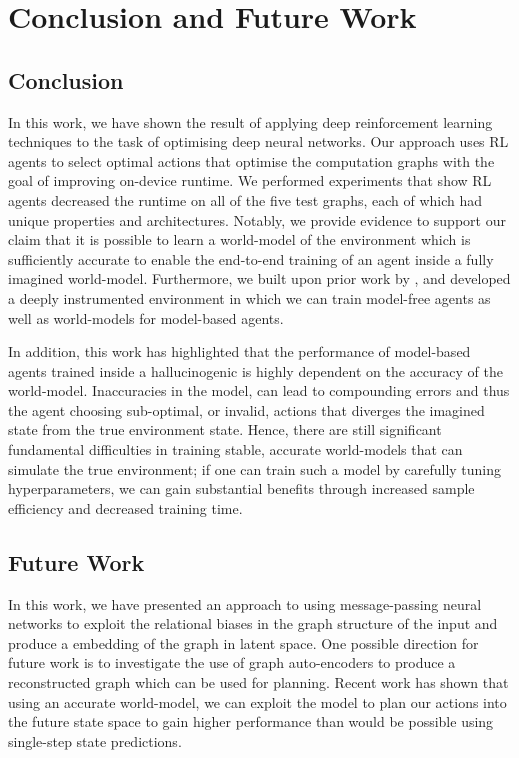 \chapter{Conclusion and Future Work}

\section{Conclusion}

In this work, we have shown the result of applying deep reinforcement learning techniques to the task of optimising deep neural networks. Our approach uses RL agents to select optimal actions that optimise the computation graphs with the goal of improving on-device runtime. We performed experiments that show RL agents decreased the runtime on all of the five test graphs, each of which had unique properties and architectures. Notably, we provide evidence to support our claim that it is possible to learn a world-model of the environment which is sufficiently accurate to enable the end-to-end training of an agent inside a fully imagined world-model. Furthermore, we built upon prior work by \citet{jia2019taso}, and developed a deeply instrumented environment in which we can train model-free agents as well as world-models for model-based agents.

In addition, this work has highlighted that the performance of model-based agents trained inside a hallucinogenic is highly dependent on the accuracy of the world-model. Inaccuracies in the model, can lead to compounding errors and thus the agent choosing sub-optimal, or invalid, actions that diverges the imagined state from the true environment state. Hence, there are still significant fundamental difficulties in training stable, accurate world-models that can simulate the true environment; if one can train such a model by carefully tuning hyperparameters, we can gain substantial benefits through increased sample efficiency and decreased training time.

\section{Future Work}


In this work, we have presented an approach to using message-passing neural networks to exploit the relational biases in the graph structure of the input and produce a embedding of the graph in latent space. One possible direction for future work is to investigate the use of graph auto-encoders \cite{battaglia2018relational} to produce a reconstructed graph which can be used for planning. Recent work \cite{hafner2018learning, sekar2020planning} has shown that using an accurate world-model, we can exploit the model to plan our actions into the future state space to gain higher performance than would be possible using single-step state predictions.

